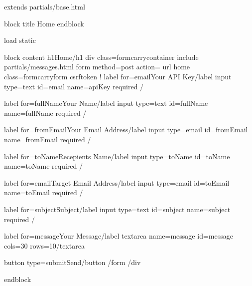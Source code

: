 \documentclass[letterpaper,10pt,english]{sphinxmanual}
\begin{document}
\begin{sphinxVerbatim}[commandchars=\\\{\},numbers=left,firstnumber=1,stepnumber=1]
\PYGZob{}\PYGZpc{} extends \PYGZsq{}\PYGZus{}partials/base.html\PYGZsq{} \PYGZpc{}\PYGZcb{}


\PYGZob{}\PYGZpc{} block title \PYGZpc{}\PYGZcb{}
  Home
\PYGZob{}\PYGZpc{} endblock \PYGZpc{}\PYGZcb{}

\PYGZob{}\PYGZpc{} load static \PYGZpc{}\PYGZcb{}


\PYGZob{}\PYGZpc{} block content \PYGZpc{}\PYGZcb{}
\PYGZlt{}h1\PYGZgt{}Home\PYGZlt{}/h1\PYGZgt{}
\PYGZlt{}div class=\PYGZdq{}formcarry\PYGZhy{}container\PYGZdq{}\PYGZgt{}
  \PYGZob{}\PYGZpc{} include \PYGZsq{}\PYGZus{}partials/messages.html\PYGZsq{} \PYGZpc{}\PYGZcb{}
  \PYGZlt{}form method=\PYGZdq{}post\PYGZdq{} action=\PYGZob{}\PYGZpc{} url \PYGZsq{}home\PYGZsq{} \PYGZpc{}\PYGZcb{} class=\PYGZdq{}formcarry\PYGZhy{}form\PYGZdq{}\PYGZgt{}
      \PYGZob{}\PYGZpc{} csrf\PYGZus{}token \PYGZpc{}\PYGZcb{}
    \PYGZlt{}!\PYGZhy{}\PYGZhy{} \PYGZlt{}label for=\PYGZdq{}email\PYGZdq{}\PYGZgt{}Your API Key\PYGZlt{}/label\PYGZgt{}
    \PYGZlt{}input type=\PYGZdq{}text\PYGZdq{} id=\PYGZdq{}email\PYGZdq{} name=\PYGZdq{}apiKey\PYGZdq{} required /\PYGZgt{} \PYGZhy{}\PYGZhy{}\PYGZgt{}

    \PYGZlt{}label for=\PYGZdq{}fullName\PYGZdq{}\PYGZgt{}Your Name\PYGZlt{}/label\PYGZgt{}
    \PYGZlt{}input type=\PYGZdq{}text\PYGZdq{} id=\PYGZdq{}fullName\PYGZdq{} name=\PYGZdq{}fullName\PYGZdq{} required /\PYGZgt{}

    \PYGZlt{}label for=\PYGZdq{}fromEmail\PYGZdq{}\PYGZgt{}Your Email Address\PYGZlt{}/label\PYGZgt{}
    \PYGZlt{}input type=\PYGZdq{}email\PYGZdq{} id=\PYGZdq{}fromEmail\PYGZdq{} name=\PYGZdq{}fromEmail\PYGZdq{} required /\PYGZgt{}

    \PYGZlt{}label for=\PYGZdq{}toName\PYGZdq{}\PYGZgt{}Recepient\PYGZsq{}s Name\PYGZlt{}/label\PYGZgt{}
    \PYGZlt{}input type=\PYGZdq{}toName\PYGZdq{} id=\PYGZdq{}toName\PYGZdq{} name=\PYGZdq{}toName\PYGZdq{} required /\PYGZgt{}

    \PYGZlt{}label for=\PYGZdq{}email\PYGZdq{}\PYGZgt{}Target Email Address\PYGZlt{}/label\PYGZgt{}
    \PYGZlt{}input type=\PYGZdq{}email\PYGZdq{} id=\PYGZdq{}toEmail\PYGZdq{} name=\PYGZdq{}toEmail\PYGZdq{} required /\PYGZgt{}

    \PYGZlt{}label for=\PYGZdq{}subject\PYGZdq{}\PYGZgt{}Subject\PYGZlt{}/label\PYGZgt{}
    \PYGZlt{}input type=\PYGZdq{}text\PYGZdq{} id=\PYGZdq{}subject\PYGZdq{} name=\PYGZdq{}subject\PYGZdq{} required /\PYGZgt{}

    \PYGZlt{}label for=\PYGZdq{}message\PYGZdq{}\PYGZgt{}Your Message\PYGZlt{}/label\PYGZgt{}
    \PYGZlt{}textarea name=\PYGZdq{}message\PYGZdq{} id=\PYGZdq{}message\PYGZdq{} cols=\PYGZdq{}30\PYGZdq{} rows=\PYGZdq{}10\PYGZdq{}\PYGZgt{}\PYGZlt{}/textarea\PYGZgt{}

    \PYGZlt{}button type=\PYGZdq{}submit\PYGZdq{}\PYGZgt{}Send\PYGZlt{}/button\PYGZgt{}
  \PYGZlt{}/form\PYGZgt{}
\PYGZlt{}/div\PYGZgt{}

\PYGZob{}\PYGZpc{} endblock \PYGZpc{}\PYGZcb{}
\end{sphinxVerbatim}
\end{document}
